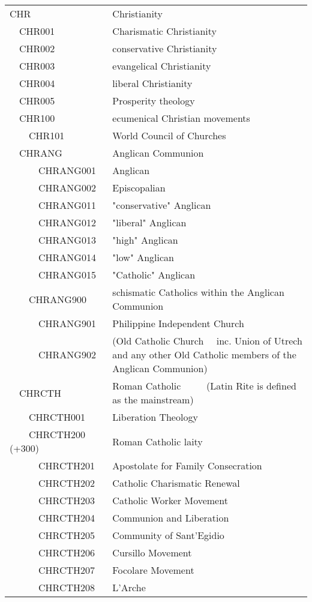 \documentclass[12pt]{article}
\begin{document}
\begin{tiny}
\begin{center}
\begin{longtable}{|l|l|}
 \\
{\normalsize CHR } & {\normalsize Christianity } \\
~~CHR001 & Charismatic Christianity \\
~~CHR002 & conservative Christianity \\
~~CHR003 & evangelical Christianity \\
~~CHR004 & liberal Christianity \\
~~CHR005 & Prosperity theology \\
~~CHR100 & ecumenical Christian movements \\
~~~~CHR101 & World Council of Churches \\
~~CHRANG & Anglican Communion \\
~~~~~~CHRANG001 & Anglican \\
~~~~~~CHRANG002 & Episcopalian \\
~~~~~~CHRANG011 & "conservative" Anglican \\
~~~~~~CHRANG012 & "liberal" Anglican \\
~~~~~~CHRANG013 & "high" Anglican \\
~~~~~~CHRANG014 & "low" Anglican \\
~~~~~~CHRANG015 & "Catholic" Anglican \\
~~~~CHRANG900 & schismatic Catholics within the Anglican Communion \\
~~~~~~CHRANG901 & Philippine Independent Church \\
~~~~~~CHRANG902 & (Old Catholic Church	~~inc. Union of Utrech and any other Old Catholic members of the Anglican Communion) \\
~~CHRCTH & Roman Catholic	~~	~~(Latin Rite is defined as the mainstream) \\
~~~~CHRCTH001 & Liberation Theology \\
~~~~CHRCTH200 (+300) & Roman Catholic laity \\
~~~~~~CHRCTH201 & Apostolate for Family Consecration \\
~~~~~~CHRCTH202 & Catholic Charismatic Renewal \\
~~~~~~CHRCTH203 & Catholic Worker Movement \\
~~~~~~CHRCTH204 & Communion and Liberation \\
~~~~~~CHRCTH205 & Community of Sant'Egidio \\
~~~~~~CHRCTH206 & Cursillo Movement \\
~~~~~~CHRCTH207 & Focolare Movement \\
~~~~~~CHRCTH208 & L'Arche \\

\end{longtable}
\end{center}
\end{tiny}
\end{document}
